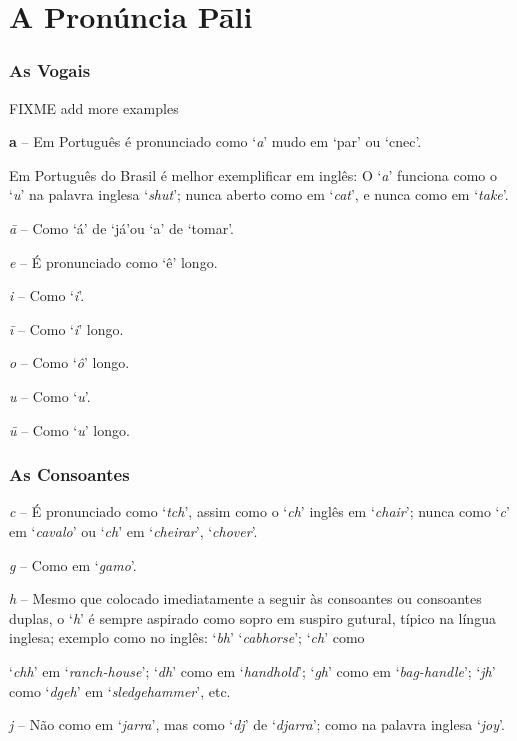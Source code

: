 \chapter{A Pronúncia Pāli}
\label{pron-pali}

\subsection{As Vogais}

FIXME add more examples

\textbf{a} -- Em Português é pronunciado como `\emph{a}' mudo em `par' ou `cnec'.

Em Português do Brasil é melhor exemplificar em inglês: O `\emph{a}' funciona como o `\emph{u}' na palavra inglesa `\emph{shut}'; nunca aberto como em `\emph{cat}', e nunca como em `\emph{take}'.

\emph{ā} -- Como `á' de `já'ou `a' de `tomar'.

\emph{e} -- É pronunciado como `ê' longo.

\emph{i} -- Como `\emph{i}'.

\emph{ī} -- Como `\emph{i}' longo.

\emph{o} -- Como `\emph{ô}' longo.

\emph{u} -- Como `\emph{u}'.

\emph{ū} -- Como `\emph{u}' longo.

\subsection{As Consoantes}

\emph{c} -- É pronunciado como `\emph{tch}', assim como o `\emph{ch}' inglês em `\emph{chair}'; nunca como `\emph{c}' em `\emph{cavalo}' ou `\emph{ch}' em `\emph{cheirar}', `\emph{chover}'.

\emph{g} -- Como em `\emph{gamo}'.

\emph{h} -- Mesmo que colocado imediatamente a seguir às consoantes ou consoantes duplas, o `\emph{h}' é sempre aspirado como sopro em suspiro gutural, típico na língua inglesa; exemplo como no inglês: `\emph{bh}' `\emph{cabhorse}'; `\emph{ch}' como

`\emph{chh}' em `\emph{ranch-house}'; `\emph{dh}' como em `\emph{handhold}'; `\emph{gh}' como em `\emph{bag-handle}'; `\emph{jh}' como `\emph{dgeh}' em `\emph{sledgehammer}', etc.

\emph{j} -- Não como em `\emph{jarra}', mas como `\emph{dj}' de `\emph{djarra}'; como na palavra inglesa `\emph{joy}'.


